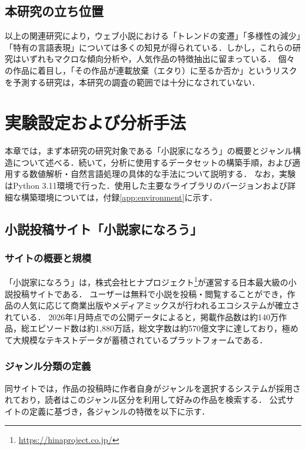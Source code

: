 \documentclass[uplatex, dvipdfmx, 11pt, a4paper, report]{jsbook}
\begin{document}
\section{本研究の立ち位置}
以上の関連研究により，ウェブ小説における「トレンドの変遷」「多様性の減少」「特有の言語表現」については多くの知見が得られている．しかし，これらの研究はいずれもマクロな傾向分析や，人気作品の特徴抽出に留まっている．
個々の作品に着目し，「その作品が連載放棄（エタり）に至るか否か」というリスクを予測する研究は，本研究の調査の範囲では十分になされていない．





\chapter{実験設定および分析手法}

本章では，まず本研究の研究対象である「小説家になろう」の概要とジャンル構造について述べる．続いて，分析に使用するデータセットの構築手順，および適用する数値解析・自然言語処理の具体的な手法について説明する．
なお，実験はPython 3.11環境で行った．使用した主要なライブラリのバージョンおよび詳細な構築環境については，付録\ref{app:environment}に示す．

\section{小説投稿サイト「小説家になろう」}

\subsection{サイトの概要と規模}
「小説家になろう」は，株式会社ヒナプロジェクト\footnote{\url{https://hinaproject.co.jp/}}が運営する日本最大級の小説投稿サイトである．
ユーザーは無料で小説を投稿・閲覧することができ，作品の人気に応じて商業出版やメディアミックスが行われるエコシステムが確立されている．
2026年1月時点での公開データによると，掲載作品数は約140万作品，総エピソード数は約1,880万話，総文字数は約570億文字に達しており，極めて大規模なテキストデータが蓄積されているプラットフォームである．

\subsection{ジャンル分類の定義}
同サイトでは，作品の投稿時に作者自身がジャンルを選択するシステムが採用されており，読者はこのジャンル区分を利用して好みの作品を検索する．
公式サイトの定義\cite{narou_help}に基づき，各ジャンルの特徴を以下に示す．
\end{document}

